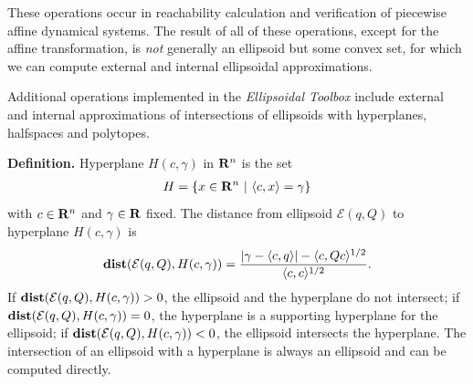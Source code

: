 \documentclass[letterpaper,10pt,english]{sphinxmanual}
\begin{document}
These operations occur in reachability calculation and verification of
piecewise affine dynamical systems. The result of all of these
operations, except for the affine transformation, is \emph{not} generally an
ellipsoid but some convex set, for which we can compute external and
internal ellipsoidal approximations.

Additional operations implemented in the \emph{Ellipsoidal Toolbox} include
external and internal approximations of intersections of ellipsoids with
hyperplanes, halfspaces and polytopes.

\textbf{Definition.} Hyperplane $H(c,\gamma)$ in
${\bf R}^n$ is the set
\label{chap_ellcalc:equation-hyperplane}\begin{gather}
\begin{split}H = \{x\in{\bf R}^n ~|~ \langle c, x\rangle = \gamma\}\end{split}\label{chap_ellcalc-hyperplane}
\end{gather}
with $c\in{\bf R}^n$ and $\gamma\in{\bf R}$ fixed.
The distance from ellipsoid ${\mathcal E}(q,Q)$ to
hyperplane $H(c,\gamma)$ is
\label{chap_ellcalc:equation-dist_hp}\begin{gather}
\begin{split}{\bf dist}({\mathcal E}(q,Q),H(c,\gamma)) =
\frac{\left|\gamma-\langle c,q\rangle\right| -
\langle c,Qc\rangle^{1/2}}{\langle c,c\rangle^{1/2}}.\end{split}\label{chap_ellcalc-dist_hp}
\end{gather}
If ${\bf dist}({\mathcal E}(q,Q),H(c,\gamma))>0$, the ellipsoid
and the hyperplane do not intersect; if
${\bf dist}({\mathcal E}(q,Q),H(c,\gamma))=0$, the hyperplane is a
supporting hyperplane for the ellipsoid; if
${\bf dist}({\mathcal E}(q,Q),H(c,\gamma))<0$, the ellipsoid
intersects the hyperplane. The intersection of an ellipsoid with a
hyperplane is always an ellipsoid and can be computed directly.
\end{document}
